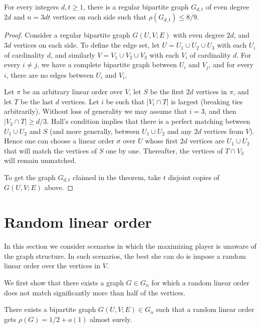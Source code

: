 \documentclass{toc}
\theoremstyle{plain}
\begin{document}
\begin{theorem}\label{thm:reg_89}
	For every integers $d, t \ge 1$, there is a regular bipartite graph $G_{d,t}$ of even degree $2d$ and $n= 3dt$ vertices on each side such that $\rho(G_{d,t}) \le 8/9$.
\end{theorem}

\begin{proof}
	Consider a regular bipartite graph $G(U,V;E)$ with even degree $2d$, and $3d$ vertices on each side. To define the edge set, let $U = U_1 \cup U_2 \cup U_3$ with each $U_i$ of cardinality $d$, and similarly $V = V_1 \cup V_2 \cup V_3$ with each $V_i$ of cardinality $d$. For every $i \not= j$, we have a complete bipartite graph between $U_i$ and $V_j$, and for every $i$, there are no edges between $U_i$ and $V_i$.
	
	Let $\pi$ be an arbitrary linear order over $V$, let $S$ be the first $2d$ vertices in $\pi$, and let $T$ be the last $d$ vertices. Let $i$ be such that $|V_i \cap T|$ is largest (breaking ties arbitrarily). Without loss of generality we may assume that $i = 3$, and then $|V_3 \cap T| \ge d/3$. Hall's condition implies that there is a perfect matching between $U_1 \cup U_2$ and $S$ (and more generally, between $U_1 \cup U_2$ and any $2d$ vertices from $V$). Hence one can choose a linear order $\sigma$ over $U$ whose first $2d$ vertices are $U_1 \cup U_2$ that will match the vertices of $S$ one by one. Thereafter, the vertices of $T \cap V_3$ will remain unmatched.
	
	To get the graph $G_{d,t}$ claimed in the theorem, take $t$ disjoint copies of $G(U,V;E)$ above.
\end{proof}






\section{Random linear order}
\label{sec:random}

In this section we consider scenarios in which the maximizing player is unaware of the graph structure.
In such scenarios, the best she can do is impose a random linear order over the vertices in $V$.

We first show that there exists a graph $G \in G_n$ for which a random linear order does not match significantly more than %
half of the vertices.%

\begin{proposition}
	There exists a bipartite graph $G(U,V;E) \in G_n$ such that a random linear order gets $\rho(G)=1/2+o(1)$ almost surely.
	\label{ex:half}
\end{proposition}
\end{document}
